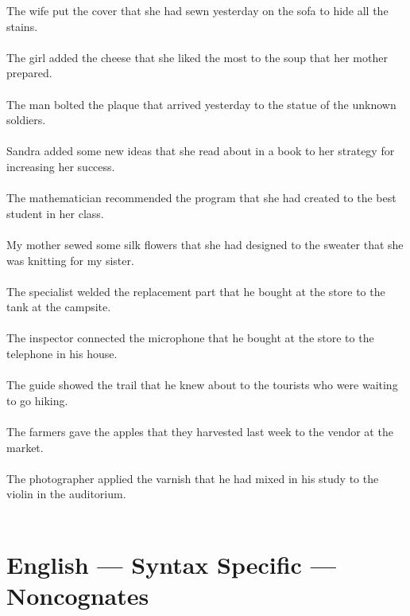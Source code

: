 The wife put the cover that she had sewn yesterday on the sofa to hide all the stains.	\\	\\
The girl added the cheese that she liked the most to the soup that her mother prepared.	\\	\\
The man bolted the plaque that arrived yesterday to the statue of the unknown soldiers.	\\	\\
Sandra added some new ideas that she read about in a book to her strategy for increasing her success.	\\	\\
The mathematician recommended the program that she had created to the best student in her class.	\\	\\
My mother sewed some silk flowers that she had designed to the sweater that she was knitting for my sister.	\\	\\
The specialist welded the replacement part that he bought at the store to the tank at the campsite.	\\	\\
The inspector connected the microphone that he bought at the store to the telephone in his house.	\\	\\
The guide showed the trail that he knew about to the tourists who were waiting to go hiking.	\\	\\
The farmers gave the apples that they harvested last week to the vendor at the market.	\\	\\
The photographer applied the varnish that he had mixed in his study to the violin in the auditorium.	\\	\\

\section{English --- Syntax Specific --- Noncognates}

